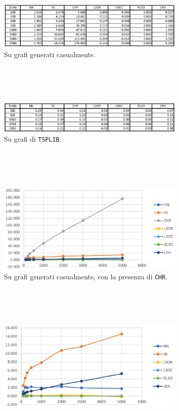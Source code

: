 \begin{figure}[H]
    \centering
    \begin{subfigure}{\linewidth}
        \centering
        \includegraphics[width=350pt]{img/ConfrontoCostiRandom.png}
        \caption*{Su grafi generati casualmente.}
    \end{subfigure}
    \ \\
    \ \\
    \ \\
    \begin{subfigure}{\linewidth}
        \centering
        \includegraphics[width=350pt]{img/ConfrontoCostiTsplib.png}
        \caption*{Su grafi di \texttt{TSPLIB}.}
    \end{subfigure}
    \ \\
    \ \\
    \ \\
    \begin{subfigure}{\linewidth}
        \centering
        \includegraphics[width=270pt]{img/GraficoCostiRandomConCHR.png}
        \caption*{Su grafi generati casualmente, con la presenza di \texttt{CHR}.}
    \end{subfigure}
    \ \\
    \ \\
    \ \\
    \begin{subfigure}{\linewidth}
        \centering
        \includegraphics[width=270pt]{img/GraficoCostiRandomSenzaCHR.png}

\end{subfigure}
\end{figure}
